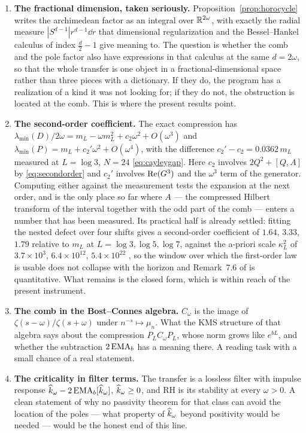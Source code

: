 \begin{enumerate}
\item \textbf{The fractional dimension, taken seriously.}
Proposition~\ref{prop:horocycle} writes the archimedean factor as an integral
over $\mathbb R^{2\omega}$, with exactly the radial measure
$|S^{d-1}|r^{d-1}\dd r$ that dimensional regularization and the Bessel--Hankel
calculus of index $\frac d2-1$ give meaning to. The question is whether the comb
and the pole factor also have expressions in that calculus at the same
$d=2\omega$, so that the whole transfer is one object in a
fractional-dimensional space rather than three pieces with a dictionary. If they
do, the program has a realization of a kind it was not looking for; if they do
not, the obstruction is located at the comb. This is where the present results
point.
\item \textbf{The second-order coefficient.} The exact compression has
$\lambda_{\min}(D)/2\omega=m_L-\omega m_L^2+c_2\omega^2+O(\omega^3)$ and
$\lambda_{\min}(P)=m_L+c_2'\omega^2+O(\omega^4)$, with the difference
$c_2'-c_2=0.0362\,m_L$ measured at $L=\log3$, $N=24$ \eqref{eq:cayleygap}. Here
$c_2$ involves $2Q^2+[Q,A]$ by \eqref{eq:secondorder} and $c_2'$ involves
$\operatorname{Re}(G^3)$ and the $\omega^3$ term of the generator. Computing either against
the measurement tests the expansion at the next order, and is the only place so
far where $A$ --- the compressed Hilbert transform of the interval together with
the odd part of the comb --- enters a number that has been measured. Its
practical half is already settled: fitting the nested defect over four shifts
gives a second-order coefficient of $1.64$, $3.33$, $1.79$ relative to $m_L$ at
$L=\log3,\log5,\log7$, against the a-priori scale $\kappa_L^2$ of
$3.7\times10^{3}$, $6.4\times10^{12}$, $5.4\times10^{22}$ \cite{HalfDimension},
so the window over which the first-order law is usable does not collapse with the
horizon and Remark~7.6 of \cite{WilsonLines} is quantitative. What remains is the
closed form, which is within reach of the present instrument.
\item \textbf{The comb in the Bost--Connes algebra.} $C_\omega$ is the image of
$\zeta(s-\omega)/\zeta(s+\omega)$ under $n^{-s}\mapsto\mu_n$. What the KMS
structure of that algebra says about the compression $P_LC_\omega P_L$, whose
norm grows like $e^{bL}$, and whether the subtraction $2\operatorname{EMA}_b$ has a meaning
there. A reading task with a small chance of a real statement.
\item \textbf{The criticality in filter terms.} The transfer is a lossless
filter with impulse response $\widehat k_\omega-2\operatorname{EMA}_b[\widehat k_\omega]$, $\widehat k_\omega\geq0$,
and RH is its stability at every $\omega>0$. A clean statement of why no
passivity theorem for that class can avoid the location of the poles --- what
property of $\widehat k_\omega$ beyond positivity would be needed --- would be the
honest end of this line.
\end{enumerate}


